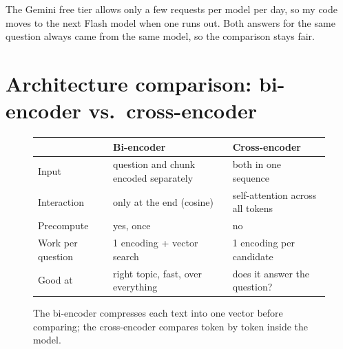 \documentclass[10pt,a4paper]{article}
\begin{document}
The Gemini free tier allows only a few requests per model per day, so my code moves to the next Flash model when one runs out.
Both answers for the same question always came from the same model, so the comparison stays fair.

\section{Architecture comparison: bi-encoder vs.\ cross-encoder}

\begin{figure}[H]
\centering
\begin{minipage}[c]{0.44\linewidth}
\centering
{}
\end{minipage}\hfill
\begin{minipage}[c]{0.54\linewidth}
\footnotesize
\begin{tabular}{@{}L{1.75cm} L{3.1cm} L{3.1cm}@{}}
\toprule
 & Bi-encoder & Cross-encoder \\
\midrule
Input & question and chunk encoded separately & both in one sequence \\
Interaction & only at the end (cosine) & self-attention across all tokens \\
Precompute & yes, once & no \\
Work per question & 1 encoding + vector search & 1 encoding per candidate \\
Good at & right topic, fast, over everything & does it answer the question? \\
\bottomrule
\end{tabular}
\end{minipage}
\caption{The bi-encoder compresses each text into one vector before comparing; the cross-encoder compares token by token inside the model.}
\end{figure}
\end{document}
